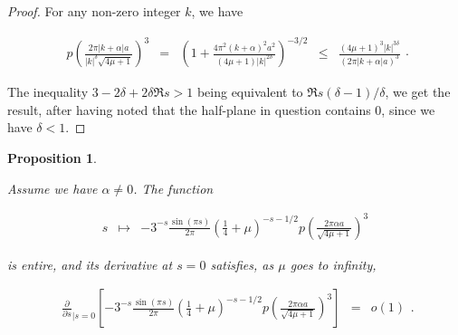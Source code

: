 \documentclass{jams-l}
\newtheorem{proposition}[theorem]{Proposition}
\theoremstyle{definition}
\theoremstyle{remark}
\numberwithin{equation}{section}
\begin{document}
            \begin{proof}
            
                For any non-zero integer $k$, we have
                
                \[ \begin{array}{lllll}
                        p \left( \frac{2 \pi \left \vert k + \alpha \right \vert a}{\left \vert k \right \vert^{\delta} \sqrt{4 \mu + 1}} \right)^3 & = & \left( 1 + \frac{4 \pi^2 \left( k + \alpha \right)^2 a^2}{\left( 4 \mu + 1 \right) \left \vert k \right \vert^{2 \delta}} \right)^{-3/2} & \leqslant & \frac{\left( 4 \mu + 1 \right)^3 \left \vert k \right \vert^{3 \delta}}{\left( 2 \pi \left \vert k + \alpha \right \vert a \right)^3}
                    \end{array} . \]
                
                \noindent The inequality $3 - 2 \delta + 2 \delta \Re s > 1$ being equivalent to $\Re s \left( \delta - 1 \right)/\delta$, we get the result, after having noted that the half-plane in question contains $0$, since we have $\delta < 1$.
            
            \end{proof}
            
            \begin{proposition}
            \label{PropA6Power3-0}
            
                Assume we have $\alpha \neq 0$. The function
                
                \[ \begin{array}{lll}
                        s & \longmapsto & - 3^{-s} \frac{\sin \left( \pi s \right)}{2 \pi} \left( \frac{1}{4} + \mu \right)^{-s-1/2} p \left( \frac{2 \pi \alpha a}{\sqrt{4 \mu + 1}} \right)^3
                    \end{array} \]
                
                \noindent is entire, and its derivative at $s=0$ satisfies, as $\mu$ goes to infinity,
                
                \[ \begin{array}{lll}
                        \scriptstyle \frac{\partial}{\partial s}_{\left \vert s = 0 \right.} \left[ - 3^{-s} \frac{\sin \left( \pi s \right)}{2 \pi} \left( \frac{1}{4} + \mu \right)^{-s-1/2} p \left( \frac{2 \pi \alpha a}{\sqrt{4 \mu + 1}} \right)^3 \right] & \scriptstyle = & \scriptstyle o \left( 1 \right)
                    \end{array} . \]
            
            \end{proposition}
            
\end{document}
